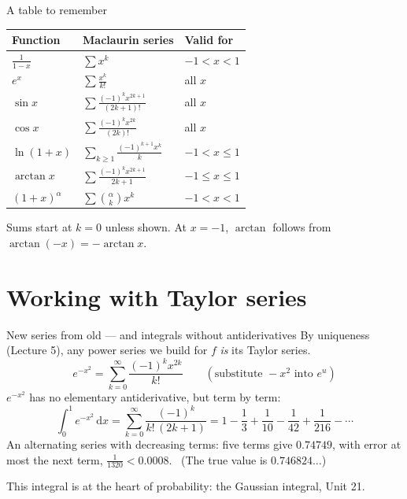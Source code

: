 \documentclass{wosm-slides}
\newcommand{\dx}{\,\mathrm{d}x}
\begin{document}
\begin{frame}{A table to remember}
  \begin{center}
  \small\renewcommand{\arraystretch}{1.45}
  \begin{tabular}{@{}lll@{}}
    \toprule
    \textbf{Function} & \textbf{Maclaurin series} & \textbf{Valid for} \\
    \midrule
    $\frac{1}{1-x}$ & $\sum x^k$ & $-1 < x < 1$ \\
    $e^x$ & $\sum \frac{x^k}{k!}$ & all $x$ \\
    $\sin x$ & $\sum \frac{(-1)^k x^{2k+1}}{(2k+1)!}$ & all $x$ \\
    $\cos x$ & $\sum \frac{(-1)^k x^{2k}}{(2k)!}$ & all $x$ \\
    $\ln(1 + x)$ & $\sum_{k \ge 1} \frac{(-1)^{k+1} x^k}{k}$ & $-1 < x \le 1$ \\
    $\arctan x$ & $\sum \frac{(-1)^k x^{2k+1}}{2k+1}$ & $-1 \le x \le 1$ \\
    $(1 + x)^\alpha$ & $\sum \binom{\alpha}{k} x^k$ & $-1 < x < 1$ \\
    \bottomrule
  \end{tabular}
  \end{center}
  {\small Sums start at $k = 0$ unless shown. At $x = -1$, $\arctan$ follows from $\arctan(-x) = -\arctan x$.\par}
\end{frame}

\section{Working with Taylor series}

\begin{frame}{New series from old --- and integrals without antiderivatives}
  By uniqueness (Lecture 5), any power series we build for $f$ \emph{is} its Taylor series.
  \[ e^{-x^2} = \sum_{k=0}^\infty \frac{(-1)^k x^{2k}}{k!} \qquad (\text{substitute } -x^2 \text{ into } e^u) \]
  \pause
  $e^{-x^2}$ has no elementary antiderivative, but term by term:
  \[ \int_0^1 e^{-x^2} \dx = \sum_{k=0}^\infty \frac{(-1)^k}{k!\,(2k+1)}
     = 1 - \frac13 + \frac{1}{10} - \frac{1}{42} + \frac{1}{216} - \cdots \]
  \pause
  An alternating series with decreasing terms: five terms give $0.74749$, with error at most
  the next term, $\frac{1}{1320} < 0.0008$. \ (The true value is $0.746824\ldots$)
  {\small This integral is at the heart of probability: the Gaussian integral, Unit 21.\par}
\end{frame}
\end{document}
